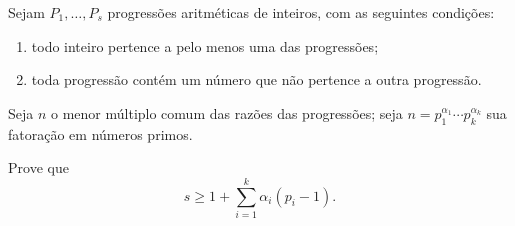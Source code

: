 Sejam $P_1, \ldots , P_s$ progressões aritméticas de inteiros, com as seguintes condições:

\begin{enumerate}[label = (\roman*)]
	\item todo inteiro pertence a pelo menos uma das progressões;
	\item toda progressão contém um número que não pertence a outra progressão.
\end{enumerate}

Seja $n$ o menor múltiplo comum das razões das progressões; seja $n=p_1^{\alpha_1} \cdots p_k^{\alpha_k}$ sua fatoração em números primos.

Prove que \[s \geq 1 + \sum^k_{i=1} \alpha_i (p_i - 1).\]
